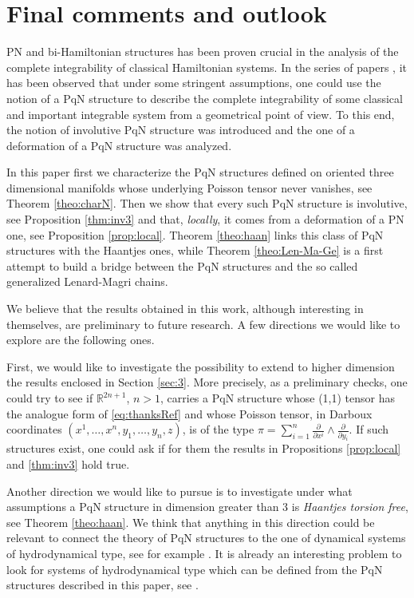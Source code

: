 \documentclass[12pt]{article}
\begin{document}
\section{Final comments and outlook}\label{sec:comfin} PN and bi-Hamiltonian structures has been proven crucial in the analysis of the complete integrability of classical Hamiltonian systems. In the series of papers \cite{FMOP2020,FMP2023,FMP2024}, it has been observed that under some stringent assumptions, one could use the notion of a PqN structure to describe the complete integrability of some classical and important integrable system from a geometrical point of view. To this end, the notion of involutive PqN structure was introduced and the one of a deformation of a PqN structure was analyzed.

In this paper first we characterize the PqN structures defined on oriented three dimensional manifolds whose underlying Poisson tensor never vanishes, see Theorem \ref{theo:charN}. Then we show that every such PqN structure is involutive, see Proposition \ref{thm:inv3} and that, \emph{locally}, it comes from a deformation of a PN one, see Proposition \ref{prop:local}. Theorem \ref{theo:haan} links this class of PqN structures with the Haantjes ones, while Theorem \ref{theo:Len-Ma-Ge} is a first attempt to build a bridge between the PqN structures and the so called generalized Lenard-Magri chains.

We believe that the results obtained in this work, although interesting in themselves, are preliminary to future research.
A few directions we would like to explore are the following ones.

First, we would like to investigate the possibility to extend to higher dimension the results enclosed in Section \ref{sec:3}. More precisely, as a preliminary checks, one could try to see if $\mathbb R^{2n+1}$, $n>1$, carries a PqN structure whose (1,1) tensor has the analogue form of \eqref{eq:thanksRef} and whose Poisson tensor, in Darboux coordinates $(x^1,\dots,x^n,y_1,\dots,y_n,z)$, is of the type $\pi=\sum_{i=1}^n\frac{\partial}{\partial x^i}\wedge\frac{\partial}{\partial y_i}$. If such structures exist, one could ask if for them the results in Propositions \ref{prop:local} and \ref{thm:inv3} hold true. 

Another direction we would like to pursue is to investigate under what assumptions a PqN structure in dimension greater than 3 is \emph{Haantjes torsion free}, see Theorem \ref{theo:haan}. We think that anything in this direction could be relevant to connect the theory of PqN structures to the one of dynamical systems of hydrodynamical type, see for example \cite{DN1,DN2}. It is already an interesting problem to look for systems of hydrodynamical type which can be defined from the PqN structures described in this paper, see \cite{FMS}. 
\end{document}
